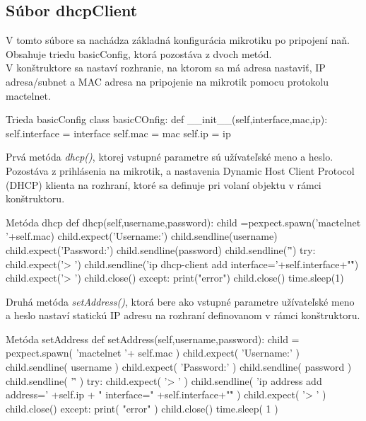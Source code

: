 \subsection{Súbor dhcpClient}
V tomto súbore sa nachádza základná konfigurácia mikrotiku po pripojení naň. Obsahuje triedu basicConfig, ktorá pozostáva z dvoch metód.\\
V konštruktore sa nastaví rozhranie, na ktorom sa má adresa nastaviť, IP adresa/subnet a MAC adresa na pripojenie na mikrotik pomocu protokolu mactelnet.\\
\begin{sexylisting}{Trieda basicConfig}
class basicCOnfig:
    def __init__(self,interface,mac,ip):
        self.interface = interface
        self.mac = mac
        self.ip = ip
\end{sexylisting}
Prvá metóda \textit{dhcp()}, ktorej vstupné parametre sú užívateľské meno a heslo. Pozostáva z prihlásenia na mikrotik, a nastavenia Dynamic Host Client Protocol (DHCP) klienta na rozhraní, ktoré sa definuje pri volaní objektu v rámci konštruktoru.\\
\begin{sexylisting}{Metóda dhcp}
 def dhcp(self,username,password):
        child =pexpect.spawn('mactelnet '+self.mac)
        child.expect('Username:')
        child.sendline(username)
        child.expect('Password:')
        child.sendline(password)
        child.sendline('\r')
        try:
            child.expect('> ')
            child.sendline('ip dhcp-client add 
            interface='+self.interface+"\r")
            child.expect('> ')
            child.close()
        except:
            print("error")
            child.close()
        time.sleep(1)
\end{sexylisting}
Druhá metóda \textit{setAddress()}, ktorá bere ako vstupné parametre užívateľské meno a heslo nastaví statickú IP adresu na rozhraní definovanom v rámci konštruktoru.
\begin{sexylisting}{Metóda setAddress}
    def setAddress(self,username,password):
        child = pexpect.spawn( 'mactelnet '+ 
        self.mac )
        child.expect( 'Username:' )
        child.sendline( username )
        child.expect( 'Password:' )
        child.sendline( password )
        child.sendline( '\r' )
        try:
            child.expect( '> ' )
            child.sendline( 'ip address add address='
            +self.ip + " interface="
            +self.interface+"\r" )
            child.expect( '> ' )
            child.close()
        except:
            print( "error" )
            child.close()
        time.sleep( 1 )
\end{sexylisting}
